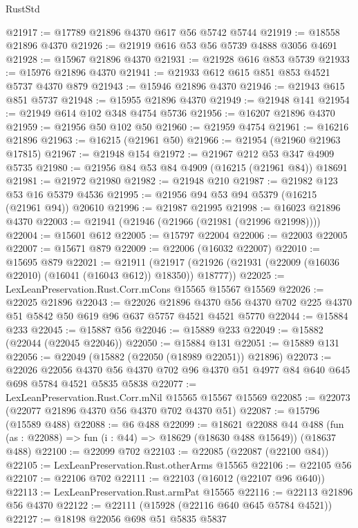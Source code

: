 \begin{lexlean}{RustStd}
\begin{coremodule}
@21917 := @17789 @21896 @4370 @617 @56 @5742 @5744
@21919 := @18558 @21896 @4370
@21926 := @21919 @616 @53 @56 @5739 @4888 @3056 @4691
@21928 := @15967 @21896 @4370
@21931 := @21928 @616 @853 @5739
@21933 := @15976 @21896 @4370
@21941 := @21933 @612 @615 @851 @853 @4521 @5737 @4370 @879
@21943 := @15946 @21896 @4370
@21946 := @21943 @615 @851 @5737
@21948 := @15955 @21896 @4370
@21949 := @21948 @141
@21954 := @21949 @614 @102 @348 @4754 @5736
@21956 := @16207 @21896 @4370
@21959 := @21956 @50 @102 @50
@21960 := @21959 @4754
@21961 := @16216 @21896
@21963 := @16215 (@21961 @50)
@21966 := @21954 (@21960 @21963 @17815)
@21967 := @21948 @154
@21972 := @21967 @212 @53 @347 @4909 @5735
@21980 := @21956 @84 @53 @84 @4909 (@16215 (@21961 @84)) @18691
@21981 := @21972 @21980
@21982 := @21948 @210
@21987 := @21982 @123 @53 @16 @5379 @4536
@21995 := @21956 @94 @53 @94 @5379 (@16215 (@21961 @94)) @20610
@21996 := @21987 @21995
@21998 := @16023 @21896 @4370
@22003 := @21941 (@21946 (@21966 (@21981 (@21996 @21998))))
@22004 := @15601 @612
@22005 := @15797 @22004
@22006 := @22003 @22005
@22007 := @15671 @879
@22009 := @22006 (@16032 @22007)
@22010 := @15695 @879
@22021 := @21911
    (@21917 (@21926 (@21931 (@22009 (@16036 @22010) (@16041 (@16043 @612)) @18350)) @18777))
@22025 := LexLeanPreservation.Rust.Corr.mCons @15565 @15567 @15569
@22026 := @22025 @21896
@22043 := @22026
    @21896
    @4370
    @56
    @4370
    @702
    @225
    @4370
    @51
    @5842
    @50
    @619
    @96
    @637
    @5757
    @4521
    @4521
    @5770
@22044 := @15884 @233
@22045 := @15887 @56
@22046 := @15889 @233
@22049 := @15882 (@22044 (@22045 @22046))
@22050 := @15884 @131
@22051 := @15889 @131
@22056 := @22049 (@15882 (@22050 (@18989 @22051)) @21896)
@22073 := @22026
    @22056
    @4370
    @56
    @4370
    @702
    @96
    @4370
    @51
    @4977
    @84
    @640
    @645
    @698
    @5784
    @4521
    @5835
    @5838
@22077 := LexLeanPreservation.Rust.Corr.mNil @15565 @15567 @15569
@22085 := @22073 (@22077 @21896 @4370 @56 @4370 @702 @4370 @51)
@22087 := @15796 (@15589 @488)
@22088 := @6 @488
@22099 := @18621
    @22088
    @44
    @488
    (fun (as : @22088) => fun (i : @44) => @18629 (@18630 @488 @15649))
    (@18637 @488)
@22100 := @22099 @702
@22103 := @22085 (@22087 (@22100 @84))
@22105 := LexLeanPreservation.Rust.otherArms @15565
@22106 := @22105 @56
@22107 := @22106 @702
@22111 := @22103 (@16012 (@22107 @96 @640))
@22113 := LexLeanPreservation.Rust.armPat @15565
@22116 := @22113 @21896 @56 @4370
@22122 := @22111 (@15928 (@22116 @640 @645 @5784 @4521))
@22127 := @18198 @22056 @698 @51 @5835 @5837

\end{coremodule}
\end{lexlean}
